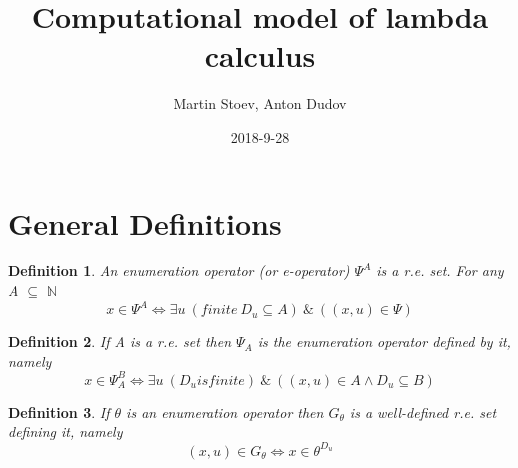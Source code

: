 \documentclass{article}
\title{Computational model of lambda calculus}
\date{2018-9-28}
\author{Martin Stoev, Anton Dudov}
\newtheorem{definition}{Definition}[section] %
\begin{document}
	\maketitle

	\newpage
	\doublespacing
	\tableofcontents
	\singlespacing

	\newpage

	\section{General Definitions}
		\begin{definition}
			An enumeration operator (or e-operator) $\Psi^A$ is a r.e. set. For any A $\subseteq$ $\mathbb{N}$
			\begin{equation}
				x \in \Psi^A \iff \exists u \:(finite \: D_u \subseteq A) \:\&\: ((x, u) \in \Psi)
			\end{equation}
		\end{definition}
			
		\begin{definition}
			If A is a r.e. set then $\Psi_A$ is the enumeration operator defined by it, namely
			\begin{equation}
				x \in \Psi^B_A \iff \exists u \: (D_u is finite) \:\&\: ((x, u) \in A \land D_u \subseteq B)
			\end{equation}
		\end{definition}
		
		\begin{definition}
			If $\theta$ is an enumeration operator then $G_\theta$ is a well-defined r.e. set defining it, namely
			\begin{equation}
				(x, u) \in G_\theta \iff x \in \theta^{D_u}
			\end{equation}
		\end{definition}
\end{document}
